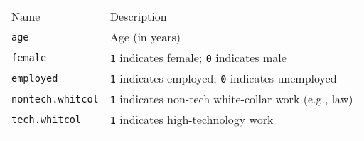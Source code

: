 \documentclass[]{article}
\begin{document}
\begin{longtable}[c]{@{}ll@{}}
\toprule\addlinespace
\begin{minipage}[b]{0.35\columnwidth}\raggedright
Name
\end{minipage} & \begin{minipage}[b]{0.58\columnwidth}\raggedright
Description
\end{minipage}
\\\addlinespace
\midrule\endhead
\begin{minipage}[t]{0.35\columnwidth}\raggedright
\texttt{age}
\end{minipage} & \begin{minipage}[t]{0.58\columnwidth}\raggedright
Age (in years)
\end{minipage}
\\\addlinespace
\begin{minipage}[t]{0.35\columnwidth}\raggedright
\texttt{female}
\end{minipage} & \begin{minipage}[t]{0.58\columnwidth}\raggedright
\texttt{1} indicates female; \texttt{0} indicates male
\end{minipage}
\\\addlinespace
\begin{minipage}[t]{0.35\columnwidth}\raggedright
\texttt{employed}
\end{minipage} & \begin{minipage}[t]{0.58\columnwidth}\raggedright
\texttt{1} indicates employed; \texttt{0} indicates unemployed
\end{minipage}
\\\addlinespace
\begin{minipage}[t]{0.35\columnwidth}\raggedright
\texttt{nontech.whitcol}
\end{minipage} & \begin{minipage}[t]{0.58\columnwidth}\raggedright
\texttt{1} indicates non-tech white-collar work (e.g., law)
\end{minipage}
\\\addlinespace
\begin{minipage}[t]{0.35\columnwidth}\raggedright
\texttt{tech.whitcol}
\end{minipage} & \begin{minipage}[t]{0.58\columnwidth}\raggedright
\texttt{1} indicates high-technology work
\end{minipage}
\\\addlinespace
\begin{minipage}[t]{0.35\columnwidth}\raggedright

\end{minipage}
\end{longtable}
\end{document}
